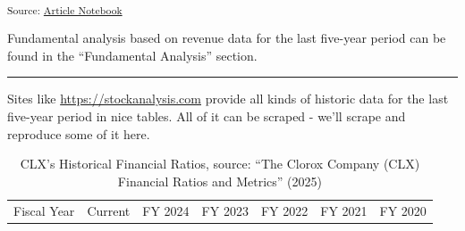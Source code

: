 \documentclass[
  letterpaper,
  DIV=11,
  numbers=noendperiod]{scrartcl}
\begin{document}
\textsubscript{Source:
\href{https://ds-an.github.io/computational-finance-project/index.qmd.html}{Article
Notebook}}

Fundamental analysis based on revenue data for the last five-year period
can be found in the ``Fundamental Analysis'' section.

\begin{center}\rule{0.5\linewidth}{0.5pt}\end{center}

Sites like \url{https://stockanalysis.com} provide all kinds of historic
data for the last five-year period in nice tables. All of it can be
scraped - we'll scrape and reproduce some of it here.

\begin{longtable}[]{@{}
  >{\raggedright\arraybackslash}p{}
  >{\raggedright\arraybackslash}p{}
  >{\raggedright\arraybackslash}p{}
  >{\raggedright\arraybackslash}p{}
  >{\raggedright\arraybackslash}p{}
  >{\raggedright\arraybackslash}p{}
  >{\raggedright\arraybackslash}p{}@{}}
\caption{CLX's Historical Financial Ratios, source: {``The {Clorox
Company} ({CLX}) {Financial Ratios} and {Metrics}''}
(2025)}\tabularnewline
\toprule\noalign{}
\begin{minipage}[b]{\linewidth}\raggedright
Fiscal Year
\end{minipage} & \begin{minipage}[b]{\linewidth}\raggedright
Current
\end{minipage} & \begin{minipage}[b]{\linewidth}\raggedright
FY 2024
\end{minipage} & \begin{minipage}[b]{\linewidth}\raggedright
FY 2023
\end{minipage} & \begin{minipage}[b]{\linewidth}\raggedright
FY 2022
\end{minipage} & \begin{minipage}[b]{\linewidth}\raggedright
FY 2021
\end{minipage} & \begin{minipage}[b]{\linewidth}\raggedright
FY 2020
\end{minipage} \\

\end{longtable}
\end{document}
